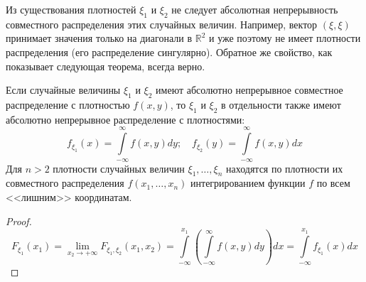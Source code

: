 \begin{rmrk}
    Из существования плотностей $\xi_1$ и $\xi_2$ не следует абсолютная непрерывность совместного распределения этих случайных величин. Например, вектор $(\xi, \xi)$ принимает значения только на диагонали в $\mathbb{R}^2$ и уже поэтому не имеет плотности распределения (его распределение сингулярно). Обратное же свойство, как показывает следующая теорема, всегда верно.
\end{rmrk}

\begin{thm*}
    Если случайные величины $\xi_1$ и $\xi_2$ имеют абсолютно непрерывное совместное распределение с плотностью $f(x, y)$, то $\xi_1$ и $\xi_2$ в отдельности также имеют абсолютно непрерывное распределение с плотностями:
    \begin{equation*}
        f_{\xi_{1}}(x)=\int\limits_{-\infty}^{\infty} f(x, y) d y ; \quad f_{\xi_{2}}(y)=\int\limits_{-\infty}^{\infty} f(x, y) d x
    \end{equation*}
    Для $n > 2$ плотности случайных величин $\xi_1, \ldots, \xi_n$ находятся по плотности их совместного распределения $f(x_1, \ldots, x_n)$ интегрированием функции $f$ по всем <<лишним>> координатам.
\end{thm*}
\begin{proof}
\begin{equation*}
    F_{\xi_{1}}\left(x_{1}\right)
    = \lim _{x_{2} \rightarrow+\infty} F_{\xi_{1}, \xi_{2}}\left(x_{1}, x_{2}\right)
    = \int\limits_{-\infty}^{x_{1}}\left(\int\limits_{-\infty}^{\infty} f(x, y) d y\right) d x
    = \int\limits_{-\infty}^{x_{1}} f_{\xi_{1}}(x) d x
\end{equation*}
\end{proof}


